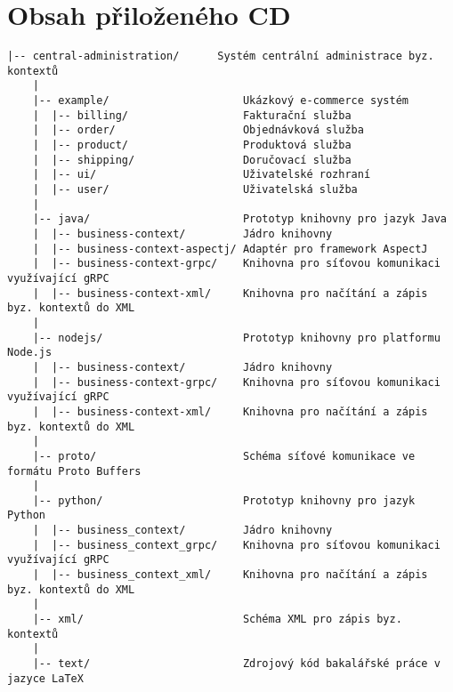 
\chapter{Obsah přiloženého CD}

\begin{Verbatim}[fontsize=\footnotesize]
    |-- central-administration/      Systém centrální administrace byz. kontextů
    |
    |-- example/                     Ukázkový e-commerce systém
    |  |-- billing/                  Fakturační služba
    |  |-- order/                    Objednávková služba
    |  |-- product/                  Produktová služba
    |  |-- shipping/                 Doručovací služba
    |  |-- ui/                       Uživatelské rozhraní
    |  |-- user/                     Uživatelská služba
    |
    |-- java/                        Prototyp knihovny pro jazyk Java
    |  |-- business-context/         Jádro knihovny
    |  |-- business-context-aspectj/ Adaptér pro framework AspectJ
    |  |-- business-context-grpc/    Knihovna pro síťovou komunikaci využívající gRPC
    |  |-- business-context-xml/     Knihovna pro načítání a zápis byz. kontextů do XML
    |
    |-- nodejs/                      Prototyp knihovny pro platformu Node.js
    |  |-- business-context/         Jádro knihovny
    |  |-- business-context-grpc/    Knihovna pro síťovou komunikaci využívající gRPC
    |  |-- business-context-xml/     Knihovna pro načítání a zápis byz. kontextů do XML
    |
    |-- proto/                       Schéma síťové komunikace ve formátu Proto Buffers
    |
    |-- python/                      Prototyp knihovny pro jazyk Python
    |  |-- business_context/         Jádro knihovny
    |  |-- business_context_grpc/    Knihovna pro síťovou komunikaci využívající gRPC
    |  |-- business_context_xml/     Knihovna pro načítání a zápis byz. kontextů do XML
    |
    |-- xml/                         Schéma XML pro zápis byz. kontextů
    |
    |-- text/                        Zdrojový kód bakalářské práce v jazyce LaTeX
\end{Verbatim}
